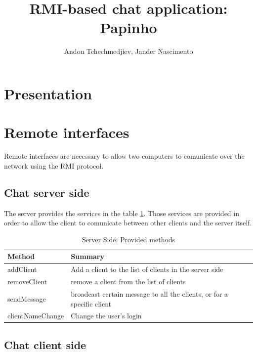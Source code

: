 \documentclass[8pt,a4paper]{article}
\title {RMI-based chat application: Papinho}
\author{Andon Tchechmedjiev, Jander Nascimento}
\begin{document}
\maketitle
\section{Presentation}
\section{Remote interfaces}

Remote interfaces are necessary to allow two computers to comunicate over the network using the RMI protocol. 

\subsection{Chat server side}

The server provides the services in the table \ref{tab:serverprovide}. Those services are provided in order to allow the client to comunicate between other clients and the server itself. 

  \begin{table}[H]
  \begin{center}
      \begin{tabular}{ | l | p{5cm} |}
      \hline
      Method & Summary \\ \hline
      addClient & Add a client to the list of clients in the server side \\ \hline 
      removeClient & remove a client from the list of clients \\ \hline
      sendMessage &  broadcast certain message to all the clients, or for a specific client\\ \hline
      clientNameChange & Change the user's login \\ \hline
      \end{tabular}
  \end{center}
  \caption{Server Side: Provided methods}
  \label{tab:serverprovide}
  \end{table}

\subsection{Chat client side}
\end{document}
